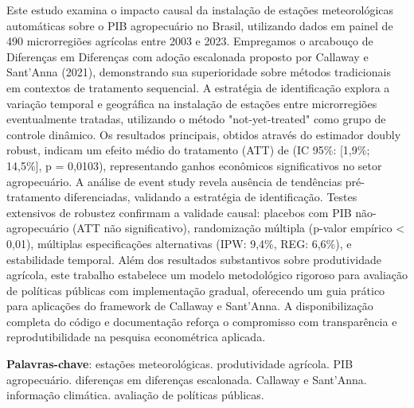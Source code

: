 \documentclass[
	12pt,				%
	oneside,			%
	a4paper,			%
	english,			%
	french,				%
	spanish,			%
	brazil				%
	]{abntex2}
\begin{document}
\setlength{\absparsep}{18pt} %
\begin{resumo}
Este estudo examina o impacto causal da instalação de estações meteorológicas automáticas sobre o PIB agropecuário no Brasil, utilizando dados em painel de 490 microrregiões agrícolas entre 2003 e 2023. Empregamos o arcabouço de Diferenças em Diferenças com adoção escalonada proposto por Callaway e Sant'Anna (2021), demonstrando sua superioridade sobre métodos tradicionais em contextos de tratamento sequencial. A estratégia de identificação explora a variação temporal e geográfica na instalação de estações entre microrregiões eventualmente tratadas, utilizando o método "not-yet-treated" como grupo de controle dinâmico. Os resultados principais, obtidos através do estimador doubly robust, indicam um efeito médio do tratamento (ATT) de \mainattpct{} (IC 95\%: [1,9\%; 14,5\%], p = 0,0103), representando ganhos econômicos significativos no setor agropecuário. A análise de event study revela ausência de tendências pré-tratamento diferenciadas, validando a estratégia de identificação. Testes extensivos de robustez confirmam a validade causal: placebos com PIB não-agropecuário (ATT não significativo), randomização múltipla (p-valor empírico < 0,01), múltiplas especificações alternativas (IPW: 9,4\%, REG: 6,6\%), e estabilidade temporal. Além dos resultados substantivos sobre produtividade agrícola, este trabalho estabelece um modelo metodológico rigoroso para avaliação de políticas públicas com implementação gradual, oferecendo um guia prático para aplicações do framework de Callaway e Sant'Anna. A disponibilização completa do código e documentação reforça o compromisso com transparência e reprodutibilidade na pesquisa econométrica aplicada.

 \textbf{Palavras-chave}: estações meteorológicas. produtividade agrícola. PIB agropecuário. diferenças em diferenças escalonada. Callaway e Sant'Anna. informação climática. avaliação de políticas públicas.
\end{resumo}
\end{document}
